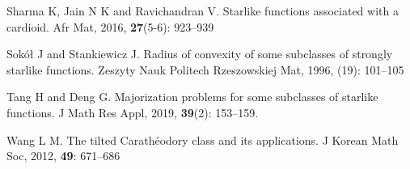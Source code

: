 \documentclass[12pt, reqno]{amsart}
\numberwithin{equation}{section}
\theoremstyle{plain}
\theoremstyle{definition}
\theoremstyle{remark}
\begin{document}
\begin{thebibliography}{99}
 Sharma K,  Jain N K and Ravichandran V. Starlike functions associated with a cardioid. Afr Mat, 2016, {\bf 27}(5-6): 923--939

  {Sok\'{o}\l} J and Stankiewicz J. Radius of convexity of some subclasses of strongly starlike functions. Zeszyty Nauk Politech Rzeszowskiej Mat, 1996, (19): 101--105

  Tang H and Deng G. Majorization problems for some subclasses of starlike functions. J Math Res Appl, 2019, {\bf 39}(2): 153--159. 


  Wang L M. The tilted Carath\'{e}odory class and its applications. J Korean Math Soc, 2012, {\bf49}:  671--686

\end{thebibliography}
\end{document}
